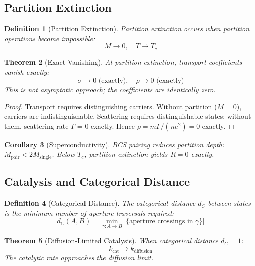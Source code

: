 \documentclass[twocolumn,amsmath,amssymb,aps,prl,superscriptaddress]{revtex4-2}
\newtheorem{theorem}{Theorem}[section]
\newtheorem{corollary}[theorem]{Corollary}
\newtheorem{definition}[theorem]{Definition}
\newcommand{\Mpart}{M}
\begin{document}
\subsection{Partition Extinction}

\begin{definition}[Partition Extinction]
Partition extinction occurs when partition operations become impossible:
\begin{equation}
\Mpart \to 0, \quad T \to T_c
\end{equation}
\end{definition}

\begin{theorem}[Exact Vanishing]
\label{thm:exact}
At partition extinction, transport coefficients vanish \emph{exactly}:
\begin{equation}
\boxed{\sigma \to 0 \text{ (exactly)}, \quad \rho \to 0 \text{ (exactly)}}
\end{equation}
This is not asymptotic approach; the coefficients are identically zero.
\end{theorem}

\begin{proof}
Transport requires distinguishing carriers. Without partition ($\Mpart = 0$), carriers are indistinguishable. Scattering requires distinguishable states; without them, scattering rate $\Gamma = 0$ exactly. Hence $\rho = m\Gamma/(ne^2) = 0$ exactly.
\end{proof}

\begin{corollary}[Superconductivity]
BCS pairing reduces partition depth: $\Mpart_{\text{pair}} < 2\Mpart_{\text{single}}$. Below $T_c$, partition extinction yields $R = 0$ exactly.
\end{corollary}

\subsection{Catalysis and Categorical Distance}

\begin{definition}[Categorical Distance]
The categorical distance $d_C$ between states is the minimum number of aperture traversals required:
\begin{equation}
d_C(A, B) = \min_{\gamma: A \to B} |\{\text{aperture crossings in } \gamma\}|
\end{equation}
\end{definition}

\begin{theorem}[Diffusion-Limited Catalysis]
\label{thm:catalysis}
When categorical distance $d_C = 1$:
\begin{equation}
\boxed{k_{\text{cat}} \to k_{\text{diffusion}}}
\end{equation}
The catalytic rate approaches the diffusion limit.
\end{theorem}
\end{document}
